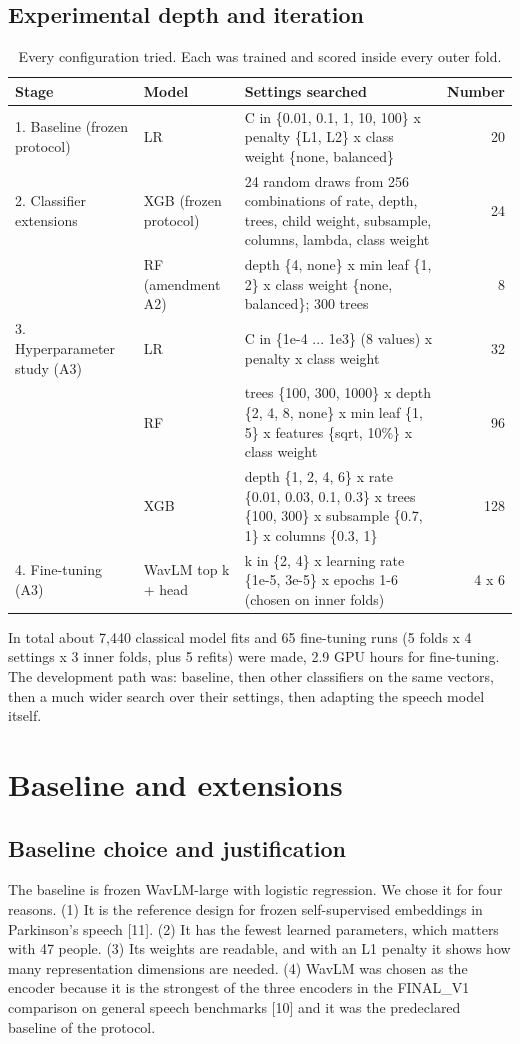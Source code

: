 \documentclass[11pt,a4paper]{article}
\begin{document}
\subsection{Experimental depth and iteration}\label{sec:depth}
\begin{table}[H]\centering\footnotesize\renewcommand{\arraystretch}{1.15}
\caption{Every configuration tried. Each was trained and scored inside every outer fold.}
\begin{tabular}{p{3.4cm}p{2.9cm}p{8.0cm}r}
\toprule
\textbf{Stage} & \textbf{Model} & \textbf{Settings searched} & \textbf{Number}\\
\midrule
1. Baseline (frozen protocol) & LR & C in \{0.01, 0.1, 1, 10, 100\} x penalty \{L1, L2\} x class weight \{none, balanced\} & 20\\
2. Classifier extensions & XGB (frozen protocol) & 24 random draws from 256 combinations of rate, depth, trees, child weight, subsample, columns, lambda, class weight & 24\\
 & RF (amendment A2) & depth \{4, none\} x min leaf \{1, 2\} x class weight \{none, balanced\}; 300 trees & 8\\
3. Hyperparameter study (A3) & LR & C in \{1e-4 ... 1e3\} (8 values) x penalty x class weight & 32\\
 & RF & trees \{100, 300, 1000\} x depth \{2, 4, 8, none\} x min leaf \{1, 5\} x features \{sqrt, 10\%\} x class weight & 96\\
 & XGB & depth \{1, 2, 4, 6\} x rate \{0.01, 0.03, 0.1, 0.3\} x trees \{100, 300\} x subsample \{0.7, 1\} x columns \{0.3, 1\} & 128\\
4. Fine-tuning (A3) & WavLM top k + head & k in \{2, 4\} x learning rate \{1e-5, 3e-5\} x epochs 1-6 (chosen on inner folds) & 4 x 6\\
\bottomrule
\end{tabular}\end{table}
In total about 7,440 classical model fits and 65 fine-tuning runs (5 folds x 4 settings x 3 inner folds, plus 5 refits) were made, 2.9 GPU hours for fine-tuning. The development path was: baseline, then other classifiers on the same vectors, then a much wider search over their settings, then adapting the speech model itself.

\section{Baseline and extensions}\label{sec:baseline}
\subsection{Baseline choice and justification}\label{sec:baselinechoice}
The baseline is frozen WavLM-large with logistic regression. We chose it for four reasons. (1) It is the reference design for frozen self-supervised embeddings in Parkinson's speech [11]. (2) It has the fewest learned parameters, which matters with 47 people. (3) Its weights are readable, and with an L1 penalty it shows how many representation dimensions are needed. (4) WavLM was chosen as the encoder because it is the strongest of the three encoders in the FINAL\_V1 comparison on general speech benchmarks [10] and it was the predeclared baseline of the protocol.
\end{document}
